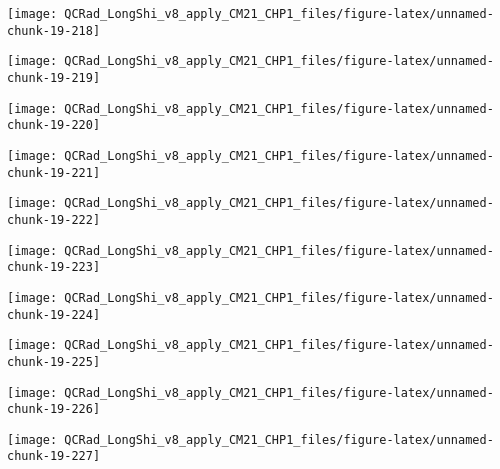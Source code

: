 \documentclass[
  10pt,
  a4paper,oneside]{article}
\begin{document}
\begin{center}\texttt{[image: QCRad\_LongShi\_v8\_apply\_CM21\_CHP1\_files/figure-latex/unnamed-chunk-19-218]} \end{center}

\begin{center}\texttt{[image: QCRad\_LongShi\_v8\_apply\_CM21\_CHP1\_files/figure-latex/unnamed-chunk-19-219]} \end{center}

\begin{center}\texttt{[image: QCRad\_LongShi\_v8\_apply\_CM21\_CHP1\_files/figure-latex/unnamed-chunk-19-220]} \end{center}

\begin{center}\texttt{[image: QCRad\_LongShi\_v8\_apply\_CM21\_CHP1\_files/figure-latex/unnamed-chunk-19-221]} \end{center}

\begin{center}\texttt{[image: QCRad\_LongShi\_v8\_apply\_CM21\_CHP1\_files/figure-latex/unnamed-chunk-19-222]} \end{center}

\begin{center}\texttt{[image: QCRad\_LongShi\_v8\_apply\_CM21\_CHP1\_files/figure-latex/unnamed-chunk-19-223]} \end{center}

\begin{center}\texttt{[image: QCRad\_LongShi\_v8\_apply\_CM21\_CHP1\_files/figure-latex/unnamed-chunk-19-224]} \end{center}

\begin{center}\texttt{[image: QCRad\_LongShi\_v8\_apply\_CM21\_CHP1\_files/figure-latex/unnamed-chunk-19-225]} \end{center}

\begin{center}\texttt{[image: QCRad\_LongShi\_v8\_apply\_CM21\_CHP1\_files/figure-latex/unnamed-chunk-19-226]} \end{center}

\begin{center}\texttt{[image: QCRad\_LongShi\_v8\_apply\_CM21\_CHP1\_files/figure-latex/unnamed-chunk-19-227]} \end{center}
\end{document}
